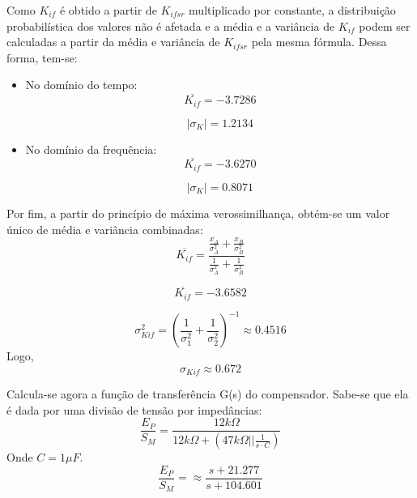 \begin{itemize}
Como $K_{if}$ é obtido a partir de $K_{ifsr}$ multiplicado por constante, a distribuição probabilística dos valores não é afetada e a média e a variância de $K_{if}$ podem ser calculadas a partir da média e variância de $K_{ifsr}$ pela mesma fórmula. Dessa forma, tem-se:\\
\begin{itemize}
\item 
No domínio do tempo:
    \begin{equation}
        \overline{K_{if}} = -3.7286
    \end{equation}

    \begin{equation}
        |\sigma_K|=1.2134
    \end{equation}
\item 
No domínio da frequência:\\
    \begin{equation}
        \overline{K_{if}} =-3.6270
    \end{equation}

    \begin{equation}
        |\sigma_K|= 0.8071
    \end{equation}
\end{itemize}

Por fim, a partir do princípio de máxima verossimilhança, obtém-se um valor único de média e variância combinadas:\\
\begin{equation}
        \overline{K_{if}}=\frac{\frac{x_A}{\sigma_A^2}+\frac{x_B}{\sigma_B^2}}{\frac{1}{\sigma_A^2}+\frac{1}{\sigma_B^2}}
\end{equation}

\begin{equation}
    \boxed{
        \overline{K_{if}}= -3.6582
    }
\end{equation}

\begin{equation}
\sigma_{Kif}^2=\left(\frac{1}{\sigma_1^2}+\frac{1}{\sigma_2^2} \right)^{-1} \approx 0.4516
\end{equation}
Logo, 
\begin{equation}
\sigma_{Kif}\approx 0.672
\end{equation}

\end{itemize}

Calcula-se agora a função de transferência G(s) do compensador. Sabe-se que ela é dada por uma divisão de tensão por impedâncias:\\
\begin{equation}
\frac{E_P}{S_M}=\frac{12k\Omega}{12k\Omega+(47k\Omega|| \frac{1}{s\cdot C})}
\end{equation}
Onde $C=1\mu F$.
\begin{equation}
    \boxed{
        \frac{E_P}{S_M}=\approx \frac{s+21.277}{s+104.601}
    }
\end{equation}



